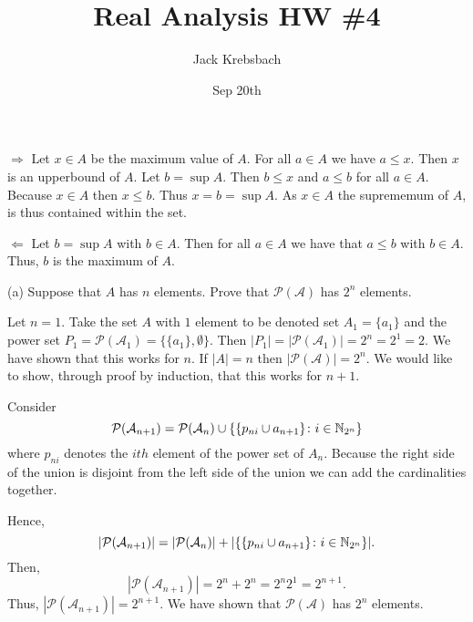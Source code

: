\documentclass{report}
\title{Real Analysis HW \#4}
\author{Jack Krebsbach }
\date{Sep 20th}
\begin{document}
\maketitle
{}

\sol 

\begin{myproof}
    
\smallskip  
$\Rightarrow$ Let $x \in A$ be the maximum value of $A$. For all $a \in A$ we have $ a \leq x$. Then $x$ is an upperbound of $A.$ Let $b= \sup A.$ Then $b \leq x$  and $a \leq b$ for all $a \in A$. Because $x\in A$ then $x \leq b$. Thus $x = b = \sup A.$ As $x \in A$ the suprememum of $A$, is thus contained within the set.

$\Leftarrow$
Let $b = \sup A$ with $b \in A.$ Then for all $a \in A$ we have that $a \leq b$ with $b \in A$. Thus, $b$ is the maximum of $A.$ 

\end{myproof}


(a) Suppose that $A$ has $n$ elements. Prove that $\mathcal{P}(\mathcal{A})$ has $2^n$ elements.
\bigskip
\par
\sol

Let $n=1.$ Take the set $A$ with $1$ element to be denoted set $A_1=\{ a_1 \}$ and the power set $P_1 = \mathcal{P}(\mathcal{A}_1)= \{\{a_1\}, \emptyset \}.$ Then $|P_1| = |\mathcal{P}(\mathcal{A}_1)|= 2^n  = 2^1 = 2.$  We have shown that this works for $n$. If $
|A| = n$ then $|\mathcal{P}(\mathcal{A})| = 2^{n}.$ We would like to show, through proof by induction, that this works for $n+1.$ \par
Consider $$\mathcal{P}(\mathcal{A}_{n+1}) = \mathcal{P}(\mathcal{A}_{n}) \cup  \{ \{p_{ni}\cup {a_{n+1}}\} \colon i  \in \NN_{2^n}\}$$  where $p_{ni}$ denotes the $ith$ element of the power set of $A_n.$ Because the right side of the union is disjoint from the left side of the union we can add the cardinalities together.

Hence, $$ |\mathcal{P}(\mathcal{A}_{n+1})| = |\mathcal{P}(\mathcal{A}_{n})| + |\{ \{p_{ni}\cup {a_{n+1}}\} \colon i  \in \NN_{2^n}\}|.$$
Then,
$$ |\mathcal{P}(\mathcal{A}_{n+1})| = 2^n +2^n= 2^n2^1 = 2^{n+1}.$$ Thus, $|\mathcal{P}(\mathcal{A}_{n+1})| = 2^{n+1}.$ We have shown that $\mathcal{P}(\mathcal{A})$ has $2^n$ elements.
\end{document}
